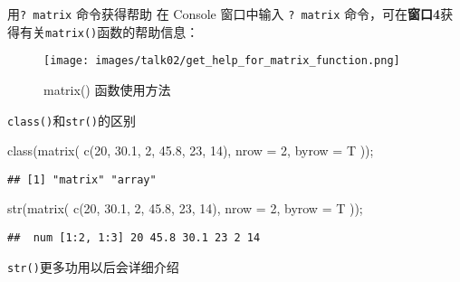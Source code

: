 \documentclass[ignorenonframetext,]{beamer}
\newenvironment{Shaded}{\begin{snugshade}}{\end{snugshade}}
\newcommand{\AttributeTok}[1]{\textcolor[rgb]{0.77,0.63,0.00}{#1}}
\newcommand{\DecValTok}[1]{\textcolor[rgb]{0.00,0.00,0.81}{#1}}
\newcommand{\FloatTok}[1]{\textcolor[rgb]{0.00,0.00,0.81}{#1}}
\newcommand{\FunctionTok}[1]{\textcolor[rgb]{0.00,0.00,0.00}{#1}}
\newcommand{\NormalTok}[1]{#1}
\newcommand\FontSmall{\fontsize{7}{8}\selectfont}
\newcommand\FontNormal{\fontsize{10}{10}\selectfont}
\begin{document}
\begin{frame}[fragile]{用\texttt{?\ matrix} 命令获得帮助}
\protect\hypertarget{ux7528-matrix-ux547dux4ee4ux83b7ux5f97ux5e2eux52a9}{}
在 Console 窗口中输入 \texttt{?\ matrix}
命令，可在\textbf{窗口4}获得有关\texttt{matrix()}函数的帮助信息：

\begin{figure}
\centering
\texttt{[image: images/talk02/get\_help\_for\_matrix\_function.png]}
\caption{matrix() 函数使用方法}
\end{figure}
\end{frame}

\begin{frame}[fragile]{\texttt{class()}和\texttt{str()}的区别}
\protect\hypertarget{classux548cstrux7684ux533aux522b}{}
\FontSmall

\begin{Shaded}
\begin{Highlighting}[]
\FunctionTok{class}\NormalTok{(}\FunctionTok{matrix}\NormalTok{( }\FunctionTok{c}\NormalTok{(}\DecValTok{20}\NormalTok{, }\FloatTok{30.1}\NormalTok{, }\DecValTok{2}\NormalTok{, }\FloatTok{45.8}\NormalTok{, }\DecValTok{23}\NormalTok{, }\DecValTok{14}\NormalTok{), }
              \AttributeTok{nrow =} \DecValTok{2}\NormalTok{, }\AttributeTok{byrow =}\NormalTok{ T ));}
\end{Highlighting}
\end{Shaded}

\begin{verbatim}
## [1] "matrix" "array"
\end{verbatim}

\begin{Shaded}
\begin{Highlighting}[]
\FunctionTok{str}\NormalTok{(}\FunctionTok{matrix}\NormalTok{( }\FunctionTok{c}\NormalTok{(}\DecValTok{20}\NormalTok{, }\FloatTok{30.1}\NormalTok{, }\DecValTok{2}\NormalTok{, }\FloatTok{45.8}\NormalTok{, }\DecValTok{23}\NormalTok{, }\DecValTok{14}\NormalTok{), }
            \AttributeTok{nrow =} \DecValTok{2}\NormalTok{, }\AttributeTok{byrow =}\NormalTok{ T ));}
\end{Highlighting}
\end{Shaded}

\begin{verbatim}
##  num [1:2, 1:3] 20 45.8 30.1 23 2 14
\end{verbatim}

\FontNormal

\texttt{str()}更多功用以后会详细介绍
\end{frame}
\end{document}
